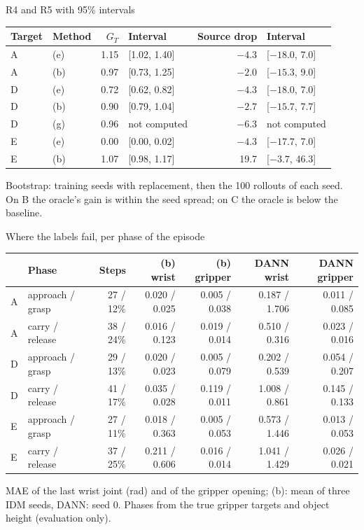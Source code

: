 \documentclass[aspectratio=169,11pt]{beamer}
\def\topicname{}
\newcommand{\topic}[1]{\gdef\topicname{#1}}
\begin{document}
\appendix
\topic{Backup}

\begin{frame}{R4 and R5 with 95\% intervals}
  \centering
  \small
  \begin{tabular}{@{}llrlrl@{}}
    \toprule
    Target & Method & $G_T$ & Interval & Source drop & Interval \\
    \midrule
    A & (e) & 1.15 & [1.02, 1.40] & $-4.3$ & [$-18.0$, 7.0] \\
    A & (b) & 0.97 & [0.73, 1.25] & $-2.0$ & [$-15.3$, 9.0] \\
    D & (e) & 0.72 & [0.62, 0.82] & $-4.3$ & [$-18.0$, 7.0] \\
    D & (b) & 0.90 & [0.79, 1.04] & $-2.7$ & [$-15.7$, 7.7] \\
    D & (g) & 0.96 & not computed & $-6.3$ & not computed \\
    E & (e) & 0.00 & [0.00, 0.02] & $-4.3$ & [$-17.7$, 7.0] \\
    E & (b) & 1.07 & [0.98, 1.17] & 19.7 & [$-3.7$, 46.3] \\
    \bottomrule
  \end{tabular}

  \vspace{0.5em}
  Bootstrap: training seeds with replacement, then the 100 rollouts of each seed. On B the
  oracle's gain is within the seed spread; on C the oracle is below the baseline.
\end{frame}

\begin{frame}{Where the labels fail, per phase of the episode}
  \centering
  \scriptsize
  \begin{tabular}{@{}llrrrrr@{}}
    \toprule
    & Phase & Steps & (b) wrist & (b) gripper & DANN wrist & DANN gripper \\
    \midrule
    A & approach / grasp & 27 / 12\% & 0.020 / 0.025 & 0.005 / 0.038 & 0.187 / 1.706 & 0.011 / 0.085 \\
    A & carry / release & 38 / 24\% & 0.016 / 0.123 & 0.019 / 0.014 & 0.510 / 0.316 & 0.023 / 0.016 \\
    D & approach / grasp & 29 / 13\% & 0.020 / 0.023 & 0.005 / 0.079 & 0.202 / 0.539 & 0.054 / 0.207 \\
    D & carry / release & 41 / 17\% & 0.035 / 0.028 & 0.119 / 0.011 & 1.008 / 0.861 & 0.145 / 0.133 \\
    E & approach / grasp & 27 / 11\% & 0.018 / 0.363 & 0.005 / 0.053 & 0.573 / 1.446 & 0.013 / 0.053 \\
    E & carry / release & 37 / 25\% & 0.211 / 0.606 & 0.016 / 0.014 & 1.041 / 1.429 & 0.026 / 0.021 \\
    \bottomrule
  \end{tabular}

  \vspace{0.5em}
  \small MAE of the last wrist joint (rad) and of the gripper opening; (b): mean of three
  IDM seeds, DANN: seed 0. Phases from the true gripper targets and object height
  (evaluation only).
\end{frame}
\end{document}
